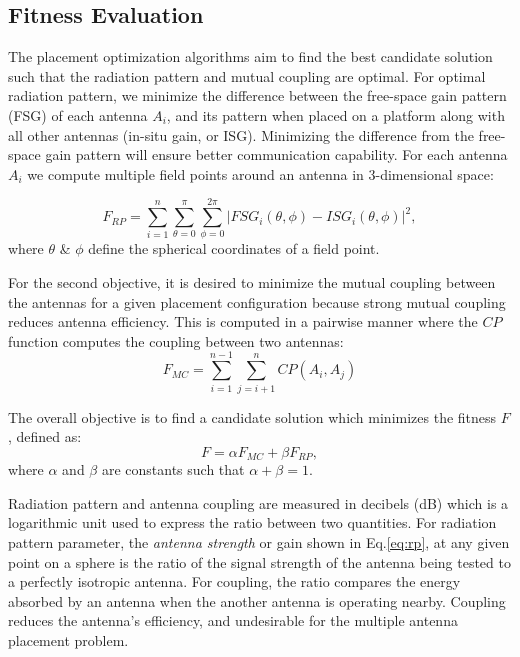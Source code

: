 \documentclass[conference]{IEEEtran}
\begin{document}
\subsection{Fitness Evaluation}
The placement optimization algorithms aim to find the best candidate solution such that the radiation pattern and mutual coupling are optimal. For optimal radiation pattern, we minimize the difference between the free-space gain pattern (FSG) of each antenna $A_i$, and its pattern when placed on a platform along with all other antennas (in-situ gain, or ISG). Minimizing the difference from the free-space gain pattern will ensure better communication capability. For each antenna $A_i$ we compute multiple field points around an antenna in 3-dimensional space:

\begin{equation} \label{eq:rp}
    F_{RP} = \sum_{i=1}^n\sum_{\theta=0}^\pi\sum_{\phi=0}^{2\pi}
           \left| FSG_i(\theta,\phi) - ISG_i(\theta,\phi) \right| ^2,
\end{equation}
where $\theta$ \& $\phi$ define the spherical coordinates of a field point.

For the second objective, it is desired to minimize the mutual coupling between the antennas for a given placement configuration because strong mutual coupling reduces antenna efficiency. This is computed in a pairwise manner where the $CP$ function computes the coupling between two antennas:
\begin{equation}
  F_{MC} = \sum_{i=1}^{n-1}\sum_{j=i+1}^{n} CP(A_i, A_j)
\end{equation}

The overall objective is to find a candidate solution which minimizes the fitness $F$, defined as:
\begin{equation} \label{eq:optimal}
  F = \alpha F_{MC} + \beta F_{RP},
\end{equation}
where $\alpha$ and $\beta$ are constants such that $\alpha + \beta = 1$. 

Radiation pattern and antenna coupling are measured in decibels (dB) which is a logarithmic unit used to express the ratio between two quantities. For radiation pattern parameter, the \textit{antenna strength} or gain shown in Eq.\eqref{eq:rp}, at any given point on a sphere is the ratio of the signal strength of the antenna being tested to a perfectly isotropic antenna. For coupling, the ratio compares the energy absorbed by an antenna when the another antenna is operating nearby. Coupling reduces the antenna's efficiency, and undesirable for the multiple antenna placement problem.
\end{document}
